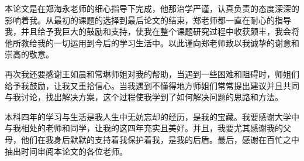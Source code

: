 \begin{acknowledgement}
  本论文是在郑海永老师的细心指导下完成，他那治学严谨，认真负责的态度深深的影响着我。从最初的课题的选择到最后论文的结束，郑老师都一直在耐心的指导我，并且给予我巨大的鼓励和支持，使我在整个课题研究过程中收获颇丰，我会将他所教给我的一切运用到今后的学习生活中。以此谨向郑老师致以我诚挚的谢意和崇高的敬意。

再次我还要感谢王如晨和常琳师姐对我的帮助，当遇到一些困难和阻碍时，师姐们给予我鼓励，让我又重拾信心。当我遇到不懂得地方师姐们常常提出建议并且共同与我讨论，找出解决方案，这个过程使我学到了如何解决问题的思路和方法。

本科四年的学习与生活是我人生中无妨忘却的经历，是我的宝藏。我要感谢大学中与我相处的老师和同学，让我的这四年充实且美好。并且，我要尤其感谢我的父母，他们在我身后默默的支持着我保护着我，是我的后盾。最后，感谢在百忙之中抽出时间审阅本论文的各位老师。

\end{acknowledgement}





